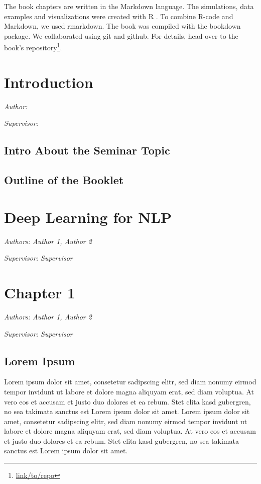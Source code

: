 \documentclass[]{krantz}
\renewcommand{\href}[2]{#2\footnote{\url{#1}}}
\begin{document}
The book chapters are written in the Markdown language. The simulations,
data examples and visualizations were created with R \citep{rlang}. To
combine R-code and Markdown, we used rmarkdown. The book was compiled
with the bookdown package. We collaborated using git and github. For
details, head over to the \href{link/to/repo}{book's repository}.

\chapter{Introduction}\label{introduction}

\emph{Author: }

\emph{Supervisor: }

\section{Intro About the Seminar
Topic}\label{intro-about-the-seminar-topic}

\section{Outline of the Booklet}\label{outline-of-the-booklet}

\chapter{Deep Learning for NLP}\label{deep-learning-for-nlp}

\emph{Authors: Author 1, Author 2}

\emph{Supervisor: Supervisor}

\chapter{Chapter 1}\label{chapter-1}

\emph{Authors: Author 1, Author 2}

\emph{Supervisor: Supervisor}

\section{Lorem Ipsum}\label{lorem-ipsum}

Lorem ipsum dolor sit amet, consetetur sadipscing elitr, sed diam nonumy
eirmod tempor invidunt ut labore et dolore magna aliquyam erat, sed diam
voluptua. At vero eos et accusam et justo duo dolores et ea rebum. Stet
clita kasd gubergren, no sea takimata sanctus est Lorem ipsum dolor sit
amet. Lorem ipsum dolor sit amet, consetetur sadipscing elitr, sed diam
nonumy eirmod tempor invidunt ut labore et dolore magna aliquyam erat,
sed diam voluptua. At vero eos et accusam et justo duo dolores et ea
rebum. Stet clita kasd gubergren, no sea takimata sanctus est Lorem
ipsum dolor sit amet.
\end{document}
